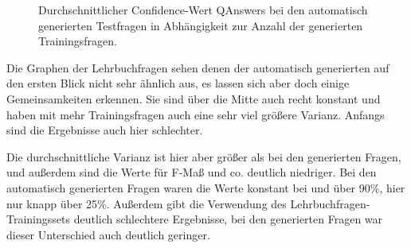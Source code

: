 \begin{figure}%
  \begin{center}
    \caption{Durchschnittlicher Confidence-Wert QAnswers bei den automatisch generierten Testfragen in Abhängigkeit zur Anzahl der generierten Trainingsfragen.}\label{plot:genconfidence}
  \end{center}
\end{figure}

Die Graphen der Lehrbuchfragen sehen denen der automatisch generierten auf den ersten Blick nicht sehr ähnlich aus,
es lassen sich aber doch einige Gemeinsamkeiten erkennen.
Sie sind über die Mitte auch recht konstant und haben mit mehr Trainingsfragen auch eine sehr viel größere Varianz.
Anfangs sind die Ergebnisse auch hier schlechter.

Die durchschnittliche Varianz ist hier aber größer als bei den generierten Fragen, und außerdem sind die Werte für F-Maß und co. deutlich niedriger.
Bei den automatisch generierten Fragen waren die Werte konstant bei und über 90\%, hier nur knapp über 25\%.
Außerdem gibt die Verwendung des Lehrbuchfragen-Trainingssets deutlich schlechtere Ergebnisse, bei den generierten Fragen war dieser Unterschied auch deutlich geringer.

